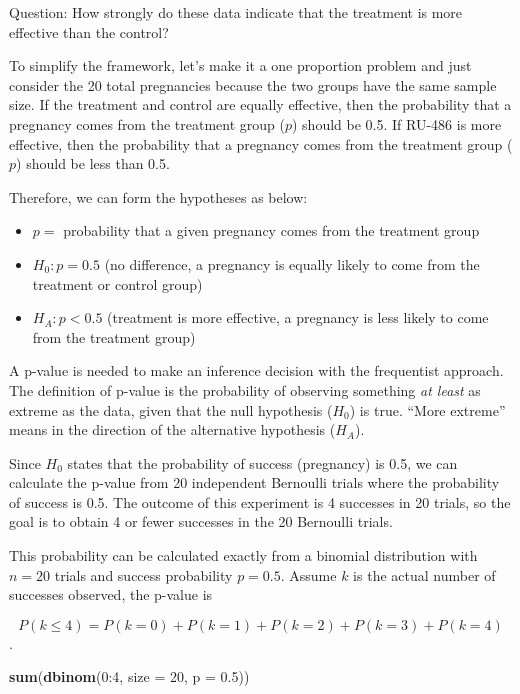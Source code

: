 \documentclass[]{book}
\newenvironment{Shaded}{\begin{snugshade}}{\end{snugshade}}
\newcommand{\KeywordTok}[1]{\textcolor[rgb]{0.13,0.29,0.53}{\textbf{{#1}}}}
\newcommand{\DataTypeTok}[1]{\textcolor[rgb]{0.13,0.29,0.53}{{#1}}}
\newcommand{\DecValTok}[1]{\textcolor[rgb]{0.00,0.00,0.81}{{#1}}}
\newcommand{\FloatTok}[1]{\textcolor[rgb]{0.00,0.00,0.81}{{#1}}}
\newcommand{\NormalTok}[1]{{#1}}
\theoremstyle{definition}
\theoremstyle{definition}
\theoremstyle{definition}
\theoremstyle{remark}
\begin{document}
Question: How strongly do these data indicate that the treatment is more
effective than the control?

To simplify the framework, let's make it a one proportion problem and
just consider the 20 total pregnancies because the two groups have the
same sample size. If the treatment and control are equally effective,
then the probability that a pregnancy comes from the treatment group
(\(p\)) should be 0.5. If RU-486 is more effective, then the probability
that a pregnancy comes from the treatment group (\(p\)) should be less
than 0.5.

Therefore, we can form the hypotheses as below:

\begin{itemize}
\item
  \(p =\) probability that a given pregnancy comes from the treatment
  group
\item
  \(H_0: p = 0.5\) (no difference, a pregnancy is equally likely to come
  from the treatment or control group)
\item
  \(H_A: p < 0.5\) (treatment is more effective, a pregnancy is less
  likely to come from the treatment group)
\end{itemize}

A p-value is needed to make an inference decision with the frequentist
approach. The definition of p-value is the probability of observing
something \emph{at least} as extreme as the data, given that the null
hypothesis (\(H_0\)) is true. ``More extreme'' means in the direction of
the alternative hypothesis (\(H_A\)).

Since \(H_0\) states that the probability of success (pregnancy) is 0.5,
we can calculate the p-value from 20 independent Bernoulli trials where
the probability of success is 0.5. The outcome of this experiment is 4
successes in 20 trials, so the goal is to obtain 4 or fewer successes in
the 20 Bernoulli trials.

This probability can be calculated exactly from a binomial distribution
with \(n=20\) trials and success probability \(p=0.5\). Assume \(k\) is
the actual number of successes observed, the p-value is

\[P(k \leq 4) = P(k = 0) + P(k = 1) + P(k = 2) + P(k = 3) + P(k = 4)\].

\begin{Shaded}
\begin{Highlighting}[]
\KeywordTok{sum}\NormalTok{(}\KeywordTok{dbinom}\NormalTok{(}\DecValTok{0}\NormalTok{:}\DecValTok{4}\NormalTok{, }\DataTypeTok{size =} \DecValTok{20}\NormalTok{, }\DataTypeTok{p =} \FloatTok{0.5}\NormalTok{))}
\end{Highlighting}
\end{Shaded}
\end{document}
